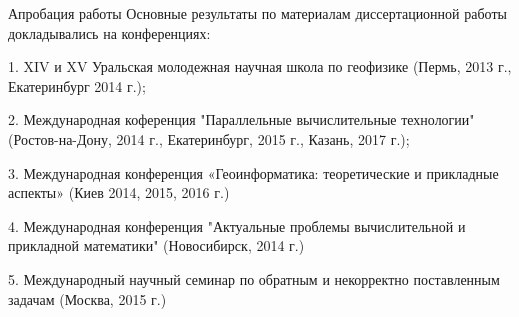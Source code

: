 \documentclass[10pt,pdf, mathserif, hyperref={unicode}]{beamer}
\begin{document}
\begin{frame}{Апробация работы}
	Основные результаты по материалам диссертационной работы докладывались на конференциях:
	
	
	1. XIV и XV Уральская молодежная научная школа по геофизике (Пермь, 2013 г., Екатеринбург 2014 г.);
	
	2. Международная коференция "Параллельные вычислительные технологии" (Ростов-на-Дону, 2014 г., Екатеринбург, 2015 г., Казань, 2017 г.);
	
	3. Международная конференция «Геоинформатика: теоретические и прикладные аспекты» (Киев 2014, 2015, 2016 г.)
	
	4. Международная конференция "Актуальные проблемы вычислительной и прикладной математики" (Новосибирск, 2014 г.)
	
	5. Международный научный семинар по обратным и некорректно поставленным задачам (Москва, 2015 г.)
\end{frame}
\end{document}
